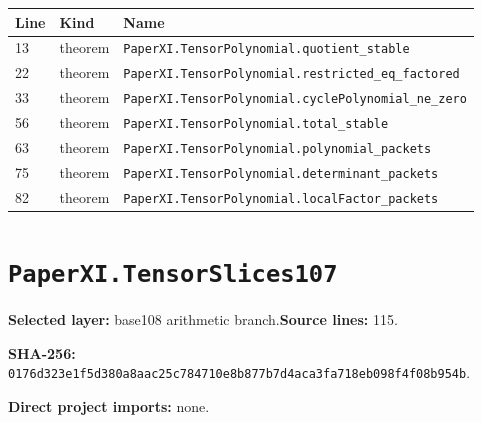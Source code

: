 \documentclass[10pt,oneside]{book}
\begin{document}
\begin{longtable}{@{}p{}p{}p{}@{}}\toprule Line&Kind&Name\\\midrule\endhead

13&theorem&\nolinkurl{PaperXI.TensorPolynomial.quotient_stable}\\

22&theorem&\nolinkurl{PaperXI.TensorPolynomial.restricted_eq_factored}\\

33&theorem&\nolinkurl{PaperXI.TensorPolynomial.cyclePolynomial_ne_zero}\\

56&theorem&\nolinkurl{PaperXI.TensorPolynomial.total_stable}\\

63&theorem&\nolinkurl{PaperXI.TensorPolynomial.polynomial_packets}\\

75&theorem&\nolinkurl{PaperXI.TensorPolynomial.determinant_packets}\\

82&theorem&\nolinkurl{PaperXI.TensorPolynomial.localFactor_packets}\\

\bottomrule\end{longtable}

\section{\texorpdfstring{\nolinkurl{PaperXI.TensorSlices107}}{PaperXI.TensorSlices107}}\label{module:PaperXI.TensorSlices107}

\textbf{Selected layer:} base108 arithmetic branch.\quad\textbf{Source lines:} 115.\par\textbf{SHA-256:} {\scriptsize\nolinkurl{0176d323e1f5d380a8aac25c784710e8b877b7d4aca3fa718eb098f4f08b954b}}.


\textbf{Direct project imports:} none.
\end{document}
